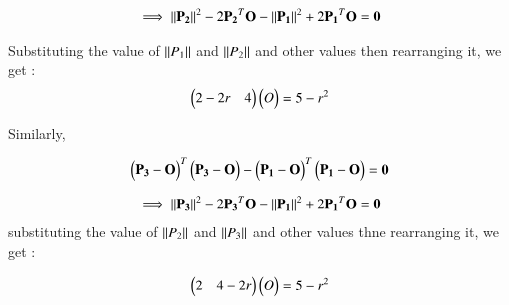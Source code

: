 \documentclass[journal,12pt,twocolumn]{IEEEtran}
\begin{document}
\begin{align}
\implies \left\lVert\mathbf{P_2}\right\rVert^2 - 2 \mathbf{P_2}^T\mathbf{O} - \left\lVert\mathbf{P_1}\right\rVert^2 +2\mathbf{P_1}^T \mathbf{O}  = \mathbf{0} \label{2.11}
\end{align}

 Substituting the value of $\left\lVert P_1\right\rVert$ and $\left\lVert P_2\right\rVert$ and other values then rearranging it, we get :
\begin{align}
\begin{pmatrix}2 -2r & 4 \\\end{pmatrix}\begin{pmatrix}O\end{pmatrix} = 5-r^2 \label{2.12}
\end{align}





Similarly,

\begin{align}
\begin{pmatrix}\mathbf{P_3} - \mathbf{O}\end{pmatrix}^T \begin{pmatrix}\mathbf{P_3} - \mathbf{ O}\end{pmatrix} - \begin{pmatrix}\mathbf{P_1} - \mathbf{O}\end{pmatrix}^T\begin{pmatrix}\mathbf{P_1} - \mathbf{O}\end{pmatrix} = \mathbf{0} \label{2.13}
\end{align}



\begin{align}
\implies \left\lVert\mathbf{P_3}\right\rVert^2 - 2 \mathbf{P_3}^T\mathbf{O} - \left\lVert\mathbf{P_1}\right\rVert^2 +2\mathbf{P_1}^T \mathbf{O}  = \mathbf{0} \label{2.14}
\end{align}
substituting the value of $\left\lVert P_2\right\rVert$ and $\left\lVert P_3\right\rVert$ and other values thne  rearranging it, we get :

\begin{align}
\begin{pmatrix}2  & 4 -2r \\\end{pmatrix}\begin{pmatrix}O\end{pmatrix} = 5-r^2 \label{2.15}
\end{align}
\end{document}

